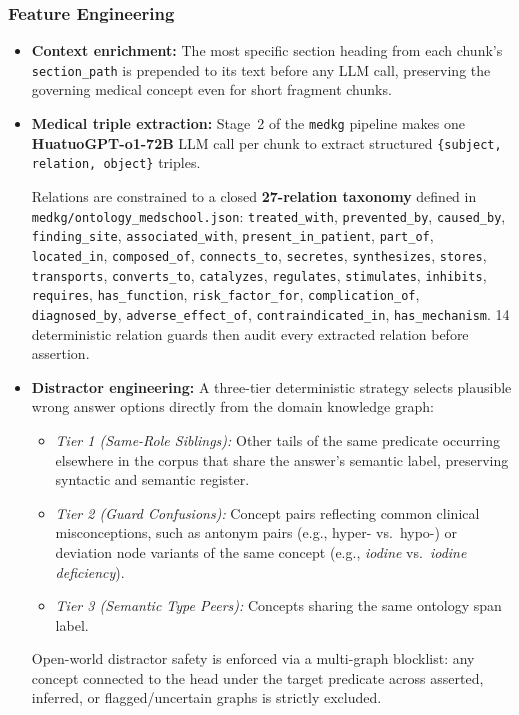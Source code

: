 \subsubsection*{Feature Engineering}

\begin{itemize}
    \item \textbf{Context enrichment:} The most specific section heading from each chunk's
          \texttt{section\_path} is prepended to its text before any LLM call, preserving the
          governing medical concept even for short fragment chunks.

    \item \textbf{Medical triple extraction:}
          Stage~2 of the \texttt{medkg} pipeline makes one \textbf{HuatuoGPT-o1-72B} LLM
          call per chunk to extract structured \texttt{\{subject, relation, object\}} triples.
          {\sloppy Relations are constrained to a closed \textbf{27-relation taxonomy} defined in
          \texttt{medkg/ontology\_medschool.json}:
          \texttt{treated\_with}, \texttt{prevented\_by}, \texttt{caused\_by},
          \texttt{finding\_site}, \texttt{associated\_with}, \texttt{present\_in\_patient},
          \texttt{part\_of}, \texttt{located\_in}, \texttt{composed\_of}, \texttt{connects\_to},
          \texttt{secretes}, \texttt{synthesizes}, \texttt{stores}, \texttt{transports},
          \texttt{converts\_to}, \texttt{catalyzes}, \texttt{regulates}, \texttt{stimulates},
          \texttt{inhibits}, \texttt{requires}, \texttt{has\_function}, \texttt{risk\_factor\_for},
          \texttt{complication\_of}, \texttt{diagnosed\_by}, \texttt{adverse\_effect\_of},
          \texttt{contraindicated\_in}, \texttt{has\_mechanism}.
          14 deterministic relation guards then audit every extracted relation before assertion.\par}

    \item \textbf{Distractor engineering:} A three-tier deterministic strategy selects plausible wrong answer options directly from the domain knowledge graph:
          \begin{itemize}
              \item \textit{Tier 1 (Same-Role Siblings):} Other tails of the same predicate occurring elsewhere in the corpus that share the answer's semantic label, preserving syntactic and semantic register.
              \item \textit{Tier 2 (Guard Confusions):} Concept pairs reflecting common clinical misconceptions, such as antonym pairs (e.g., hyper- vs.\ hypo-) or deviation node variants of the same concept (e.g., \textit{iodine} vs.\ \textit{iodine deficiency}).
              \item \textit{Tier 3 (Semantic Type Peers):} Concepts sharing the same ontology span label.
          \end{itemize}
          Open-world distractor safety is enforced via a multi-graph blocklist: any concept connected to the head under the target predicate across asserted, inferred, or flagged/uncertain graphs is strictly excluded.


\end{itemize}
